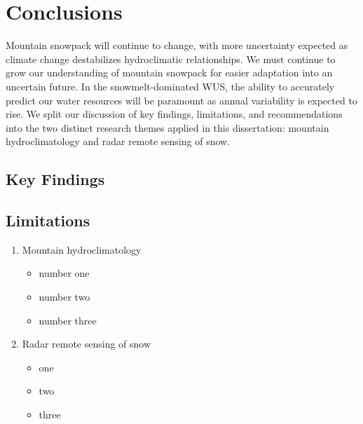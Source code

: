 
\hypertarget{ch5}{\chapter{Conclusions}\label{ch5}}

Mountain snowpack will continue to change, with more uncertainty expected as climate change destabilizes hydroclimatic relationships. We must continue to grow our understanding of mountain snowpack for easier adaptation into an uncertain future. In the snowmelt-dominated WUS, the ability to accurately predict our water resources will be paramount as annual variability is expected to rise. We split our discussion of key findings, limitations, and recommendations into the two distinct research themes applied in this dissertation: mountain hydroclimatology and radar remote sensing of snow. 

\hypertarget{ch5-intro-1}{\section{Key Findings}\label{ch5-intro-1}}



\hypertarget{ch5-intro-1}{\section{Limitations}\label{ch5-intro-1}}

\begin{enumerate}
   \item Mountain hydroclimatology
   \begin{itemize}
    \item number one   
    
    \item number two
    
    \item number three
   \end{itemize}

   \item Radar remote sensing of snow
   \begin{itemize}
     \item one

     \item two

      \item three
    
   \end{itemize}
\end{enumerate}


